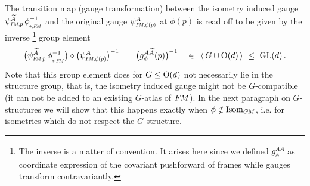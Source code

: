 The transition map (gauge transformation) between the isometry induced gauge $\psiFMp^{\widetilde{A}} \, \dphiFM^{-1}$ and the original gauge $\psiFMphip^A$ at $\phi(p)$ is read off to be given by the inverse%
\footnote{
    The inverse is a matter of convention.
    It arises here since we defined $g_\phi^{A\widetilde{A}}$ as coordinate expression of the covariant pushforward of frames while gauges transform contravariantly.
}
group element
\begin{align}\label{eq:gauge_trafo_pushforward_gauge}
    \big( \psiFMp^{\widetilde{A}} \, \dphiFM^{-1} \big) \circ \big( \psiFMphip^A \big)^{-1}
    \ =\ \big( g_\phi^{A\widetilde{A}}(p) \big)^{-1}
    \ \ \ \in\,\ \langle\, G\cup\O{d} \,\rangle\ \leq\ \GL{d} \,.
\end{align}
Note that this group element does for $G\leq\operatorname{O}(d)$ not necessarily lie in the structure group, that is, the isometry induced gauge might not be $G$-compatible (it can not be added to an existing $G$-atlas of $F\mkern-1.5muM$).
In the next paragraph on $G$-structures we will show that this happens exactly when $\phi \notin \operatorname{Isom}_{G\mkern-1.4muM}$, i.e. for isometries which do not respect the $G$-structure.


